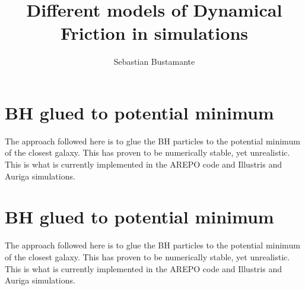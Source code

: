\documentclass[a4,useAMS,usenatbib,usegraphicx,12pt]{article}
\title{Different models of Dynamical Friction in simulations}
\author{Sebastian Bustamante}
\date{}
\begin{document}
\maketitle
\tableofcontents
 
\newpage 

\section{BH glued to potential minimum \citep{Springel2005}}

The approach followed here is to glue the BH particles to the potential minimum
of the closest galaxy. This has proven to be numerically stable, yet unrealistic.
This is what is currently implemented in the AREPO code and Illustris and Auriga
simulations.


\section{BH glued to potential minimum \citep{Springel2005}}

The approach followed here is to glue the BH particles to the potential minimum
of the closest galaxy. This has proven to be numerically stable, yet unrealistic.
This is what is currently implemented in the AREPO code and Illustris and Auriga
simulations.


\newpage

\renewcommand{\bibname}{8\ \ \ \ Bibliography}
\small

\end{document}
